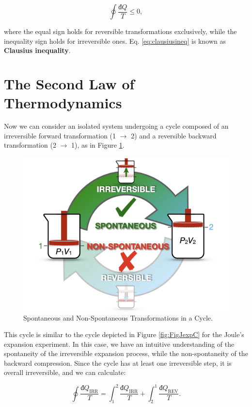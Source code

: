 \documentclass[
  9pt,
]{extbook}
\theoremstyle{definition}
\theoremstyle{definition}
\theoremstyle{definition}
\theoremstyle{definition}
\theoremstyle{remark}
\begin{document}
\begin{equation}
\oint \frac{đQ}{T} \leq 0,
\label{eq:clausiusineq}
\end{equation}

where the equal sign holds for reversible transformations exclusively, while the inequality sign holds for irreversible ones. Eq. \eqref{eq:clausiusineq} is known as \textbf{Clausius inequality}.

\section{The Second Law of Thermodynamics}\label{secondlaw}

Now we can consider an isolated system undergoing a cycle composed of an irreversible forward transformation (1 \(\rightarrow\) 2) and a reversible backward transformation (2 \(\rightarrow\) 1), as in Figure \ref{fig:FigJexpC2}.

\begin{figure}

{\centering \includegraphics[width=0.8\linewidth]{./img/OEP_Figures.011} 

}

\caption{Spontaneous and Non-Spontaneous Transformations in a Cycle.}\label{fig:FigJexpC2}
\end{figure}

This cycle is similar to the cycle depicted in Figure \ref{fig:FigJexpC} for the Joule's expansion experiment. In this case, we have an intuitive understanding of the spontaneity of the irreversible expansion process, while the non-spontaneity of the backward compression. Since the cycle has at least one irreversible step, it is overall irreversible, and we can calculate:

\begin{equation}
\oint \frac{đQ_{\mathrm{IRR}}}{T} = \int_1^2 \frac{đQ_{\mathrm{IRR}}}{T} + \int_2^1 \frac{đQ_{\mathrm{REV}}}{T}.
\label{eq:qirrcycle}
\end{equation}
\end{document}

